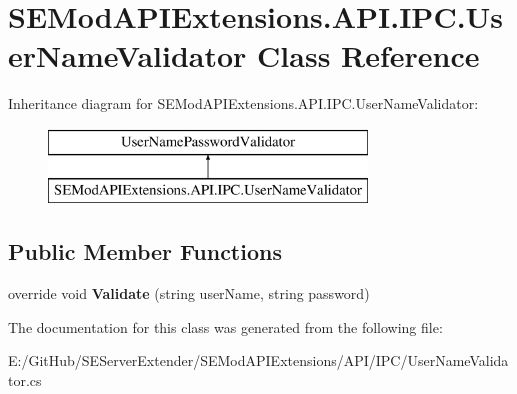 \hypertarget{class_s_e_mod_a_p_i_extensions_1_1_a_p_i_1_1_i_p_c_1_1_user_name_validator}{}\section{S\+E\+Mod\+A\+P\+I\+Extensions.\+A\+P\+I.\+I\+P\+C.\+User\+Name\+Validator Class Reference}
\label{class_s_e_mod_a_p_i_extensions_1_1_a_p_i_1_1_i_p_c_1_1_user_name_validator}
Inheritance diagram for S\+E\+Mod\+A\+P\+I\+Extensions.\+A\+P\+I.\+I\+P\+C.\+User\+Name\+Validator\+:\begin{figure}[H]
\begin{center}
\leavevmode
\includegraphics[height=2.000000cm]{class_s_e_mod_a_p_i_extensions_1_1_a_p_i_1_1_i_p_c_1_1_user_name_validator}
\end{center}
\end{figure}
\subsection*{Public Member Functions}
\begin{DoxyCompactItemize}
\item 
\hypertarget{class_s_e_mod_a_p_i_extensions_1_1_a_p_i_1_1_i_p_c_1_1_user_name_validator_a97905b7e25596f0e932627216c328cff}{}override void {\bfseries Validate} (string user\+Name, string password)\label{class_s_e_mod_a_p_i_extensions_1_1_a_p_i_1_1_i_p_c_1_1_user_name_validator_a97905b7e25596f0e932627216c328cff}

\end{DoxyCompactItemize}


The documentation for this class was generated from the following file\+:\begin{DoxyCompactItemize}
\item 
E\+:/\+Git\+Hub/\+S\+E\+Server\+Extender/\+S\+E\+Mod\+A\+P\+I\+Extensions/\+A\+P\+I/\+I\+P\+C/User\+Name\+Validator.\+cs\end{DoxyCompactItemize}
